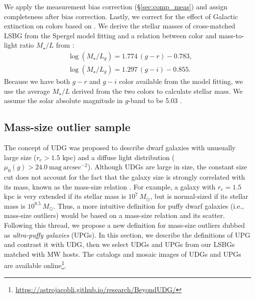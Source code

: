 \documentclass[twocolumn,astrosymb,twocolappendix]{aastex631}
\newcommand{\sbunit}{\mathrm{mag\ arcsec}^{-2}}
\newcommand{\sbcen}{\mu_{0}(g)}
\begin{document}
\begin{CJK*}{UTF8}{gbsn}
We apply the measurement bias correction (\S \ref{sec:comp_meas}) and assign completeness after bias correction. Lastly, we correct for the effect of Galactic extinction on colors based on \citet{SFD1998,Schlafly2011}. We derive the stellar masses of cross-matched LSBG from the Spergel model fitting and a relation between color and mass-to-light ratio $M_{\star}/L$ from \citet{Into2013}:
\begin{align*}
&\log \left(M_{\star} / L_{g}\right)=1.774\,(g-r)-0.783, \\
&\log \left(M_{\star} / L_{g}\right)=1.297\,(g-i)-0.855.
\end{align*}
Because we have both $g-r$ and $g-i$ color available from the model fitting, we use the average $M_{\star}/L$ derived from the two colors to calculate stellar mass. We assume the solar absolute magnitude in $g$-band to be 5.03 \citep{Willmer2018}. 



\subsection{Mass-size outlier sample}\label{sec:sample}
The concept of UDG was proposed to describe dwarf galaxies with unusually large size ($r_e>1.5$ kpc) and a diffuse light distribution ($\sbcen > 24.0\ \sbunit$). Although UDGs are large in size, the constant size cut does not account for the fact that the galaxy size is strongly correlated with its mass, known as the mass-size relation \citep[e.g.,][]{Graham2003,Trujillo2007,vanDokkum2013,Cappellari2013,Lange2015}. For example, a galaxy with $r_e = 1.5$ kpc is very extended if its stellar mass is $10^7\ M_\odot$, but is normal-sized if its stellar mass is $10^{8.5}\ M_\odot$.
Thus, a more intuitive definition for puffy dwarf galaxies (i.e., mass-size outliers) would be based on a mass-size relation and its scatter. Following this thread, we propose a new definition for mass-size outliers dubbed as \textit{ultra-puffy galaxies} (UPGs). In this section, we describe the definitions of UPG and contrast it with UDG, then we select UDGs and UPGs from our LSBGs matched with MW hosts. The catalogs and mosaic images of UDGs and UPGs are available online\footnote{\url{https://astrojacobli.github.io/research/BeyondUDG/}}.


\end{CJK*}
\end{document}
